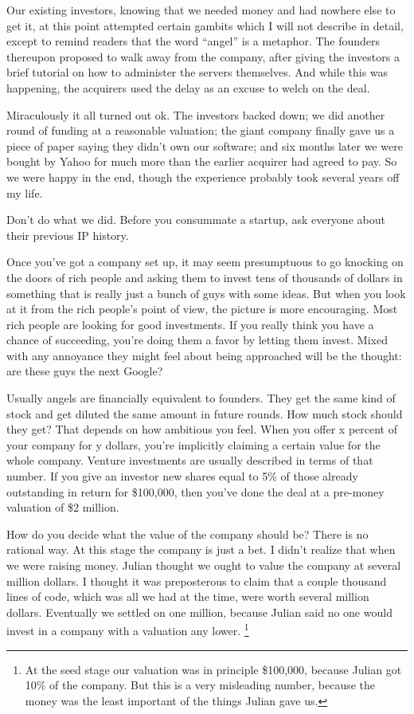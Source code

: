 \documentclass[12pt]{book}
\begin{document}
Our existing investors, knowing that we needed money and had nowhere
else to get it, at this point attempted certain gambits which I will not
describe in detail, except to remind readers that the word ``angel'' is
a metaphor. The founders thereupon proposed to walk away from the
company, after giving the investors a brief tutorial on how to
administer the servers themselves. And while this was happening, the
acquirers used the delay as an excuse to welch on the deal.

Miraculously it all turned out ok. The investors backed down; we did
another round of funding at a reasonable valuation; the giant company
finally gave us a piece of paper saying they didn't own our software;
and six months later we were bought by Yahoo for much more than the
earlier acquirer had agreed to pay. So we were happy in the end, though
the experience probably took several years off my life.

Don't do what we did. Before you consummate a startup, ask everyone
about their previous IP history.

Once you've got a company set up, it may seem presumptuous to go
knocking on the doors of rich people and asking them to invest tens of
thousands of dollars in something that is really just a bunch of guys
with some ideas. But when you look at it from the rich people's point of
view, the picture is more encouraging. Most rich people are looking for
good investments. If you really think you have a chance of succeeding,
you're doing them a favor by letting them invest. Mixed with any
annoyance they might feel about being approached will be the thought:
are these guys the next Google?

Usually angels are financially equivalent to founders. They get the same
kind of stock and get diluted the same amount in future rounds. How much
stock should they get? That depends on how ambitious you feel. When you
offer x percent of your company for y dollars, you're implicitly
claiming a certain value for the whole company. Venture investments are
usually described in terms of that number. If you give an investor new
shares equal to 5\% of those already outstanding in return for
\$100,000, then you've done the deal at a pre-money valuation of \$2
million.

How do you decide what the value of the company should be? There is no
rational way. At this stage the company is just a bet. I didn't realize
that when we were raising money. Julian thought we ought to value the
company at several million dollars. I thought it was preposterous to
claim that a couple thousand lines of code, which was all we had at the
time, were worth several million dollars. Eventually we settled on one
million, because Julian said no one would invest in a company with a
valuation any lower. \footnote{At the seed stage our valuation was in principle \$100,000,
because Julian got 10\% of the company. But this is a very misleading
number, because the money was the least important of the things Julian
gave us.}
\end{document}
